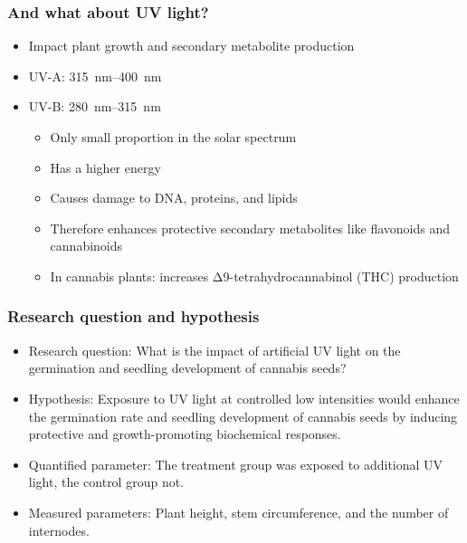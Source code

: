 \documentclass[12pt, aspectratio=1610]{beamer}
\begin{document}
    \begin{frame}
        \frametitle{And what about UV light?}
        \begin{itemize}
            \item Impact plant growth and secondary metabolite production
            \item UV-A: \qtyrange[mode=text, range-phrase=\textendash, range-units=single]{315}{400}{\nm}
            \item UV-B: \qtyrange[mode=text, range-phrase=\textendash, range-units=single]{280}{315}{\nm}
            \begin{itemize}
                \item Only small proportion in the solar spectrum
                \item Has a higher energy
                \item Causes damage to DNA, proteins, and lipids
                \item Therefore enhances protective secondary metabolites like flavonoids and cannabinoids
                \item In cannabis plants: increases Δ9-tetrahydrocannabinol (THC) production
            \end{itemize}
        \end{itemize}
        \quad \autocite{eichhorn_bilodeau_update_2019, international_organization_for_standardization_space_2007, lydon_uv-b_1987}
    \end{frame}

    \begin{frame}
        \frametitle{Research question and hypothesis}
        \begin{itemize}
            \item Research question: What is the impact of artificial UV light on the germination and seedling development of cannabis seeds?
            \item Hypothesis: Exposure to UV light at controlled low intensities would enhance the germination rate and seedling development of cannabis seeds by inducing protective and growth-promoting biochemical responses.
            \item Quantified parameter: The treatment group was exposed to additional UV light, the control group not.
            \item Measured parameters: Plant height, stem circumference, and the number of internodes.
        \end{itemize}
    \end{frame}
\end{document}
